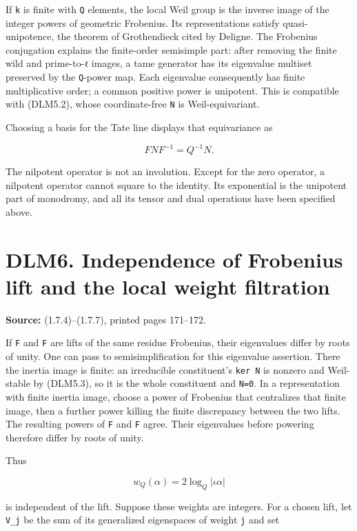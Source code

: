 \documentclass[
]{report}
\begin{document}
If \texttt{k} is finite with \texttt{Q} elements, the local Weil group
is the inverse image of the integer powers of geometric Frobenius. Its
representations satisfy quasi-unipotence, the theorem of Grothendieck
cited by Deligne. The Frobenius conjugation explains the finite-order
semisimple part: after removing the finite wild and prime-to-\texttt{ℓ}
images, a tame generator has its eigenvalue multiset preserved by the
\texttt{Q}-power map. Each eigenvalue consequently has finite
multiplicative order; a common positive power is unipotent. This is
compatible with (DLM5.2), whose coordinate-free \texttt{N} is
Weil-equivariant.

Choosing a basis for the Tate line displays that equivariance as

\[
FNF^{-1}=Q^{-1}N.
\tag{DLM5.3}
\]

The nilpotent operator is not an involution. Except for the zero
operator, a nilpotent operator cannot square to the identity. Its
exponential is the unipotent part of monodromy, and all its tensor and
dual operations have been specified above.

\section{DLM6. Independence of Frobenius lift and the local weight
filtration}\label{dlm6.-independence-of-frobenius-lift-and-the-local-weight-filtration}

\textbf{Source:} (1.7.4)--(1.7.7), printed pages 171--172.

If \texttt{F\textquotesingle{}} and
\texttt{F\textquotesingle{}\textquotesingle{}} are lifts of the same
residue Frobenius, their eigenvalues differ by roots of unity. One can
pass to semisimplification for this eigenvalue assertion. There the
inertia image is finite: an irreducible constituent's \texttt{ker\ N} is
nonzero and Weil-stable by (DLM5.3), so it is the whole constituent and
\texttt{N=0}. In a representation with finite inertia image, choose a
power of Frobenius that centralizes that finite image, then a further
power killing the finite discrepancy between the two lifts. The
resulting powers of \texttt{F\textquotesingle{}} and
\texttt{F\textquotesingle{}\textquotesingle{}} agree. Their eigenvalues
before powering therefore differ by roots of unity.

Thus

\[
w_Q(\alpha)=2\log_Q|\iota\alpha|
\]

is independent of the lift. Suppose these weights are integers. For a
chosen lift, let \texttt{V\_j\textquotesingle{}} be the sum of its
generalized eigenspaces of weight \texttt{j} and set
\end{document}
